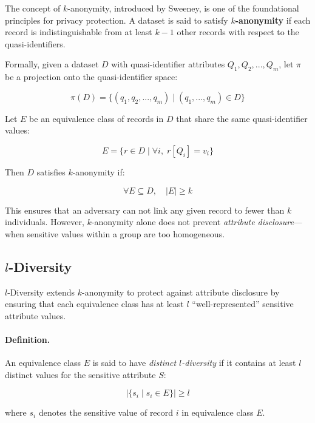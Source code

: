 \documentclass{article}
\begin{document}
The concept of $k$-anonymity, introduced by Sweeney, is one of the foundational principles for privacy protection. A dataset is said to satisfy \textbf{$k$-anonymity} if each record is indistinguishable from at least $k-1$ other records with respect to the quasi-identifiers.

Formally, given a dataset $D$ with quasi-identifier attributes $Q_1, Q_2, ..., Q_m$, let $\pi$ be a projection onto the quasi-identifier space:

$$
\pi(D) = \{ (q_1, q_2, ..., q_m) \mid (q_1, ..., q_m) \in D \}
$$

Let $E$ be an equivalence class of records in $D$ that share the same quasi-identifier values:

$$
E = \{ r \in D \mid \forall i, \; r[Q_i] = v_i \}
$$

Then $D$ satisfies $k$-anonymity if:

$$
\forall E \subseteq D, \quad |E| \geq k
$$

This ensures that an adversary can not link any given record to fewer than $k$ individuals. However, $k$-anonymity alone does not prevent \textit{attribute disclosure}—when sensitive values within a group are too homogeneous.

\subsection{$l$-Diversity }

$l$-Diversity extends $k$-anonymity to protect against attribute disclosure by ensuring that each equivalence class has at least $l$ ``well-represented'' sensitive attribute values.

\paragraph{ Definition.}
An equivalence class $E$ is said to have \textit{distinct $l$-diversity} if it contains at least $l$ distinct values for the sensitive attribute $S$:

\[
|\{ s_i \mid s_i \in E \}| \geq l
\]

where $s_i$ denotes the sensitive value of record $i$ in equivalence class $E$.
\end{document}
